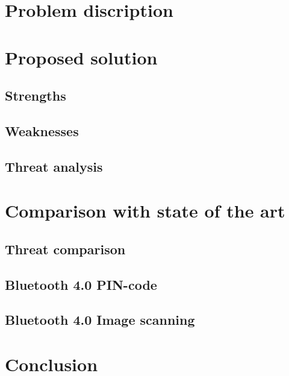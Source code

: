 \documentclass[12pt]{article}
\begin{document}
\newpage

\section{Problem discription}
\label{sec:Problem}

\newpage

\section{Proposed solution}
\label{sec:Proposed solution}

\subsection{Strengths}
\label{sub:Strengths}

\subsection{Weaknesses}
\label{sub:Weaknesses}

\subsection{Threat analysis}
\label{sub:Threat analysis}

\newpage

\section{Comparison with state of the art}
\label{sec:Comparison with state of the art}

\subsection{Threat comparison}
\label{sub:Threat comparison}

\subsection{Bluetooth 4.0 PIN-code}
\label{sub:Bluetooth 4.0 PIN-code}

\subsection{Bluetooth 4.0 Image scanning}
\label{sub:Bluetooth 4.0 Image scanning}

\section{Conclusion}
\label{sec:Conclusion}

\newpage


\nocite{*}

\end{document}
